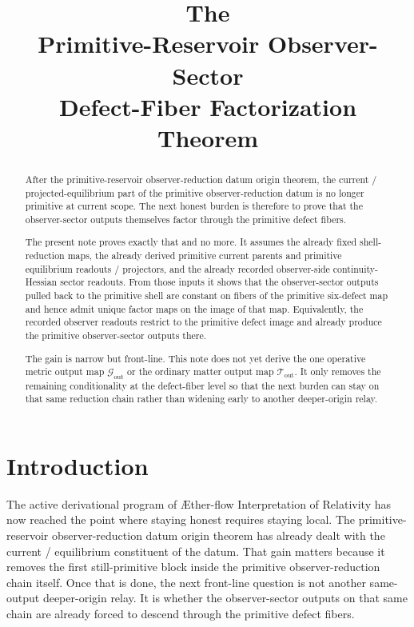 \documentclass[11pt]{article}
\title{\textbf{The \TheoryName{}}\\[0.4em]
\large Primitive-Reservoir Observer-Sector\\
\large Defect-Fiber Factorization Theorem}
\author{}
\date{}
\newcommand{\Aflow}{\AE{}ther-flow}
\newcommand{\TheoryName}{\Aflow{} Interpretation of Relativity}
\newcommand{\MetricOut}{\mathscr G_{\mathrm{out}}}
\newcommand{\MatterOut}{\mathscr T_{\mathrm{out}}}
\begin{document}
\maketitle

\begin{abstract}
After the primitive-reservoir observer-reduction datum origin theorem, the current / projected-equilibrium part of the primitive observer-reduction datum is no longer primitive at current scope. The next honest burden is therefore to prove that the observer-sector outputs themselves factor through the primitive defect fibers.

The present note proves exactly that and no more. It assumes the already fixed shell-reduction maps, the already derived primitive current parents and primitive equilibrium readouts / projectors, and the already recorded observer-side continuity-Hessian sector readouts. From those inputs it shows that the observer-sector outputs pulled back to the primitive shell are constant on fibers of the primitive six-defect map and hence admit unique factor maps on the image of that map. Equivalently, the recorded observer readouts restrict to the primitive defect image and already produce the primitive observer-sector outputs there.

The gain is narrow but front-line. This note does not yet derive the one operative metric output map \(\MetricOut\) or the ordinary matter output map \(\MatterOut\). It only removes the remaining conditionality at the defect-fiber level so that the next burden can stay on that same reduction chain rather than widening early to another deeper-origin relay.
\end{abstract}

\section{Introduction}

The active derivational program of \TheoryName{} has now reached the point where staying honest requires staying local. The primitive-reservoir observer-reduction datum origin theorem has already dealt with the current / equilibrium constituent of the datum. That gain matters because it removes the first still-primitive block inside the primitive observer-reduction chain itself. Once that is done, the next front-line question is not another same-output deeper-origin relay. It is whether the observer-sector outputs on that same chain are already forced to descend through the primitive defect fibers.
\end{document}
